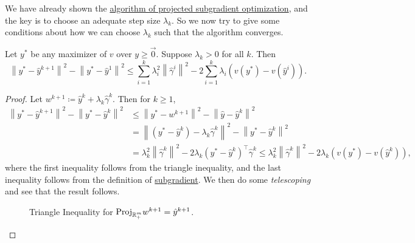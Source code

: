 \begin{prev}
	We have already shown the \hyperref[algo:projected-subgradient-optimization-algorithm]{algorithm of projected subgradient optimization}, and the key is to choose an adequate
	step size \(\lambda_{k}\). So we now try to give some conditions about how we can choose \(\lambda_{k}\) such
	that the algorithm converges.
\end{prev}

\begin{lemma}\label{lma:lec20-1}
	Let \(y^{\ast}\) be any maximizer of \(v\) over \(y\geq \vec{0}\). Suppose \(\lambda_{k}>0\) for all \(k\). Then
	\[
		\left\lVert y^{\ast} - \hat{y}^{k+1}\right\rVert^2 - \left\lVert y^{\ast} - \hat{y}^1\right\rVert^2 \leq \sum\limits_{i=1}^{k} \lambda_{i}^{2}\left\lVert \hat{\gamma}^i\right\rVert^2 - 2 \sum\limits_{i=1}^{k} \lambda_{i}\left(v(y^{\ast}) - v(\hat{y}^i)\right).
	\]
\end{lemma}
\begin{proof}
	Let \(w^{k+1} \coloneqq \hat{y}^k + \lambda_{k}\hat{\gamma}^k\). Then for \(k\geq 1\),
	\[
		\begin{split}
			\left\lVert y^{\ast} - \hat{y}^{k+1}\right\rVert^2 - \left\lVert y^{\ast} - \hat{y}^k\right\rVert^2 &\leq \left\lVert y^{\ast} - w^{k+1}\right\rVert^2 - \left\lVert \hat{y} - \hat{y}^k\right\rVert^2\\
			&= \left\lVert (y^{\ast} - \hat{y}^k) - \lambda_{k}\hat{\gamma}^k\right\rVert^2 - \left\lVert y^{\ast} - \hat{y}^k\right\rVert^2\\
			&= \lambda_{k}^{2}\left\lVert \hat{\gamma}^k\right\rVert^2 - 2\lambda_{k}(y^{\ast} - \hat{y}^k)^{\top}\hat{\gamma}^k
			\leq \lambda_{k}^{2}\left\lVert \hat{\gamma}^k\right\rVert^2 - 2\lambda_{k}(v(y^{\ast}) - v(\hat{y}^k)),
		\end{split}
	\]
	where the first inequality follows from the triangle inequality, and the last inequality follows from the definition of
	\hyperref[def:subgradient]{subgradient}. We then do some \emph{telescoping} and see that the result follows.
	\begin{figure}[H]
		\centering
		\caption{Triangle Inequality for \(\mathrm{Proj}_{\mathbb{\MakeUppercase{R}}^m_+}w^{k+1} = \hat{y}^{k+1}\).}
		\label{fig:maximizer-lemma-triangle-inequality}
	\end{figure}
\end{proof}

